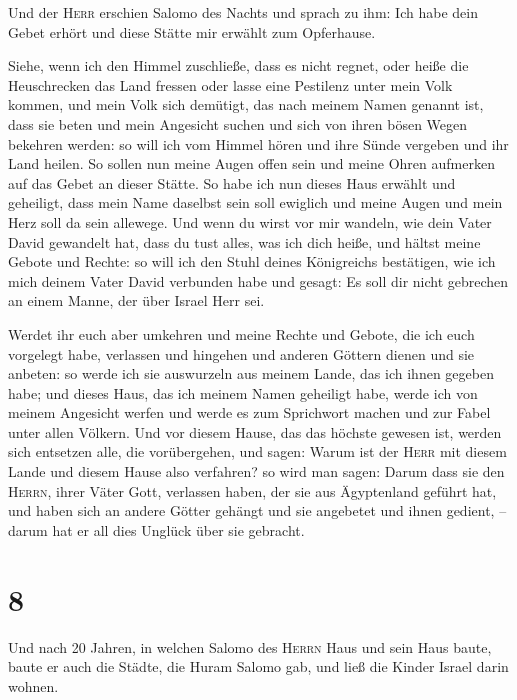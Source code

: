  Und der \textsc{Herr} erschien Salomo des Nachts und
sprach zu ihm: Ich habe dein Gebet erhört und diese Stätte mir erwählt
zum Opferhause.

 Siehe, wenn ich den Himmel zuschließe, dass es nicht
regnet, oder heiße die Heuschrecken das Land fressen oder lasse eine
Pestilenz unter mein Volk kommen,  und mein Volk sich
demütigt, das nach meinem Namen genannt ist, dass sie beten und mein
Angesicht suchen und sich von ihren bösen Wegen bekehren werden: so will
ich vom Himmel hören und ihre Sünde vergeben und ihr Land heilen.
 So sollen nun meine Augen offen sein und meine Ohren
aufmerken auf das Gebet an dieser Stätte.  So habe ich
nun dieses Haus erwählt und geheiligt, dass mein Name daselbst sein soll
ewiglich und meine Augen und mein Herz soll da sein allewege.
 Und wenn du wirst vor mir wandeln, wie dein Vater David
gewandelt hat, dass du tust alles, was ich dich heiße, und hältst meine
Gebote und Rechte:  so will ich den Stuhl deines
Königreichs bestätigen, wie ich mich deinem Vater David verbunden habe
und gesagt: Es soll dir nicht gebrechen an einem Manne, der über Israel
Herr sei.

 Werdet ihr euch aber umkehren und meine Rechte und
Gebote, die ich euch vorgelegt habe, verlassen und hingehen und anderen
Göttern dienen und sie anbeten:  so werde ich sie
auswurzeln aus meinem Lande, das ich ihnen gegeben habe; und dieses
Haus, das ich meinem Namen geheiligt habe, werde ich von meinem
Angesicht werfen und werde es zum Sprichwort machen und zur Fabel unter
allen Völkern.  Und vor diesem Hause, das das höchste
gewesen ist, werden sich entsetzen alle, die vorübergehen, und sagen:
Warum ist der \textsc{Herr} mit diesem Lande und diesem Hause also
verfahren?  so wird man sagen: Darum dass sie den
\textsc{Herrn}, ihrer Väter Gott, verlassen haben, der sie aus
Ägyptenland geführt hat, und haben sich an andere Götter gehängt und sie
angebetet und ihnen gedient, -- darum hat er all dies Unglück über sie
gebracht.

\hypertarget{section-7}{%
\section{8}\label{section-7}}

 Und nach 20 Jahren, in welchen Salomo des \textsc{Herrn}
Haus und sein Haus baute,  baute er auch die Städte, die
Huram Salomo gab, und ließ die Kinder Israel darin wohnen.

